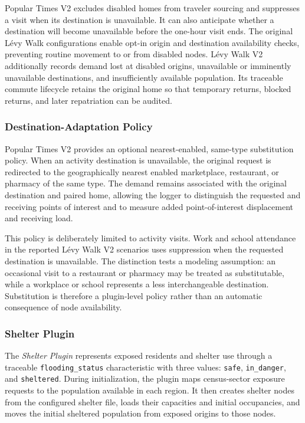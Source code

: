 Popular Times V2 excludes disabled homes from traveler sourcing and suppresses a visit when its destination is unavailable. It can also anticipate whether a destination will become unavailable before the one-hour visit ends. The original L\'evy Walk configurations enable opt-in origin and destination availability checks, preventing routine movement to or from disabled nodes. L\'evy Walk V2 additionally records demand lost at disabled origins, unavailable or imminently unavailable destinations, and insufficiently available population. Its traceable commute lifecycle retains the original home so that temporary returns, blocked returns, and later repatriation can be audited.

\subsubsection{Destination-Adaptation Policy}

Popular Times V2 provides an optional nearest-enabled, same-type substitution policy. When an activity destination is unavailable, the original request is redirected to the geographically nearest enabled marketplace, restaurant, or pharmacy of the same type. The demand remains associated with the original destination and paired home, allowing the logger to distinguish the requested and receiving points of interest and to measure added point-of-interest displacement and receiving load.

This policy is deliberately limited to activity visits. Work and school attendance in the reported L\'evy Walk V2 scenarios uses suppression when the requested destination is unavailable. The distinction tests a modeling assumption: an occasional visit to a restaurant or pharmacy may be treated as substitutable, while a workplace or school represents a less interchangeable destination. Substitution is therefore a plugin-level policy rather than an automatic consequence of node availability.

\subsubsection{Shelter Plugin}

The \textit{Shelter Plugin} represents exposed residents and shelter use through a traceable \texttt{flooding\_status} characteristic with three values: \texttt{safe}, \texttt{in\_danger}, and \texttt{sheltered}. During initialization, the plugin maps census-sector exposure requests to the population available in each region. It then creates shelter nodes from the configured shelter file, loads their capacities and initial occupancies, and moves the initial sheltered population from exposed origins to those nodes.

